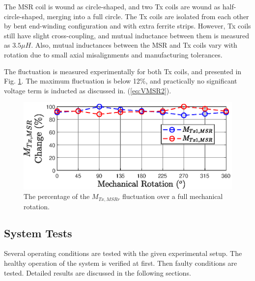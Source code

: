 \documentclass[journal]{IEEEtran}
\begin{document}
\begin{table}[h]
\end{table}

The MSR coil is wound as circle-shaped, and two Tx coils are wound as half-circle-shaped, merging into a full circle. 
The Tx coils are isolated from each other by bent end-winding configuration and with extra ferrite strips. 
However, Tx coils still have slight cross-coupling, and  mutual inductance between them is measured as $3.5 \mu H$. 
Also, mutual inductances between the MSR and Tx coils vary with rotation due to small axial misalignments and manufacturing tolerances. 

The fluctuation is measured experimentally for both Tx coils, and presented in Fig. \ref{fig:mutual_change}. The maximum fluctuation is below 12\%, and practically no significant voltage term is inducted as discussed in. (\ref{eq:VMSR2}).

\begin{figure}[h!]
   \centering
\includegraphics[width=0.90\linewidth]{Mutual_change_v2.eps}
     \caption{The percentage of the $M_{Tx,MSRr}$ fluctuation over a full mechanical rotation.}
        \label{fig:mutual_change}
\end{figure}


\subsection{System Tests}
Several operating conditions are tested with the given experimental setup. The healthy operation of the system is verified at first. Then faulty conditions are tested. Detailed results are discussed in the following sections.
\end{document}
